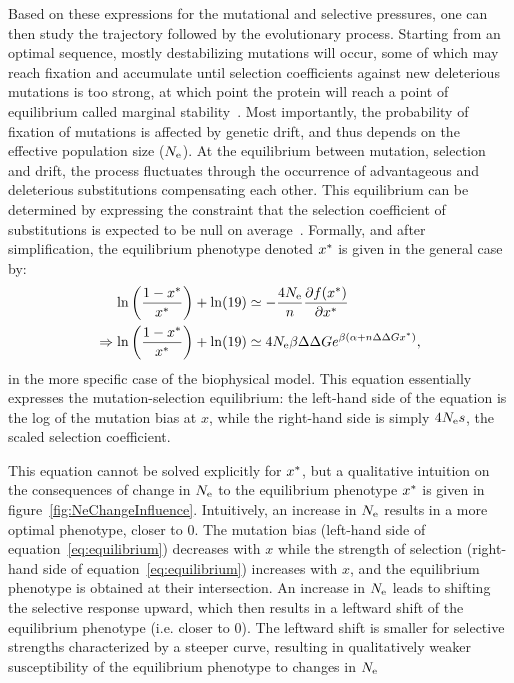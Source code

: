 Based on these expressions for the mutational and selective pressures, one can then study the trajectory followed by the evolutionary process.
Starting from an optimal sequence, mostly destabilizing mutations will occur, some of which may reach fixation and accumulate until selection coefficients against new deleterious mutations is too strong, at which point the protein will reach a point of equilibrium called marginal stability~\citep{Taverna2002, Bloom2007}.
Most importantly, the probability of fixation of mutations is affected by genetic drift, and thus depends on the effective population size ($N_{\text{e}}$).
At the equilibrium between mutation, selection and drift, the process fluctuates through the occurrence of advantageous and deleterious substitutions compensating each other.
This equilibrium can be determined by expressing the constraint that the selection coefficient of substitutions is expected to be null on average~\citep{Goldstein2013}.
Formally, and after simplification, the equilibrium phenotype denoted $x^{*}$ is given in the general case by:
\begin{align}
    \ln \left( \frac{1 - x\eq}{x\eq} \right) + \ln (19) & \simeq - \frac{4\Ne}{\NbrSites} \frac{ \partial \logfit (x\eq) }{\partial {x\eq}} \\
    \Rightarrow \ln \left( \frac{1 - x\eq}{x\eq} \right) + \ln (19) & \simeq 4\Ne \beta \DeltaDeltaG e^{\beta (\DeltaGmin + \NbrSites \DeltaDeltaG x\eq)} \text{,} \label{eq:equilibrium}
\end{align}
in the more specific case of the biophysical model.
This equation essentially expresses the mutation-selection equilibrium: the left-hand side of the equation is the log of the mutation bias at $x$, while the right-hand side is simply $4 N_{\text{e}} s$, the scaled selection coefficient.

This equation cannot be solved explicitly for $x^{*}$, but a qualitative intuition on the consequences of change in $N_{\text{e}}$ to the equilibrium phenotype $x^{*}$ is given in figure~\ref{fig:NeChangeInfluence}.
Intuitively, an increase in $N_{\text{e}}$ results in a more optimal phenotype, closer to $0$.
The mutation bias (left-hand side of equation~\ref{eq:equilibrium}) decreases with $x$ while the strength of selection (right-hand side of equation~\ref{eq:equilibrium}) increases with $x$, and the equilibrium phenotype is obtained at their intersection.
An increase in $N_{\text{e}}$ leads to shifting the selective response upward, which then results in a leftward shift of the equilibrium phenotype (i.e. closer to $0$).
The leftward shift is smaller for selective strengths characterized by a steeper curve, resulting in qualitatively weaker susceptibility of the equilibrium phenotype to changes in $N_{\text{e}}$

